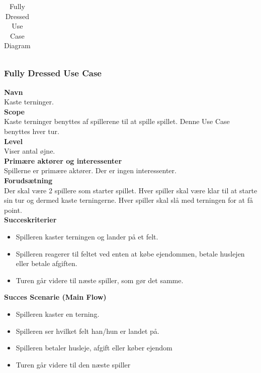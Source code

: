 \begin{table}[H]
\begin{tabular}{|p{0.3\linewidth} | p{0.6\linewidth}|}
        
        
        
        
        
        \end{tabular}
        \caption{Fully Dressed Use Case Diagram}
        \end{table}
        
        \clearpage
        
        \subsubsection{Fully Dressed Use Case}
        \textbf{Navn}\\
        Kaste terninger.\\
        
        \textbf{Scope}\\
        Kaste terninger benyttes af spillerene til at spille spillet. Denne Use Case benyttes hver tur.\\
        
        \textbf{Level}\\
        Viser antal øjne.\\
        
        \textbf{Primære aktører og interessenter} \\
        Spillerne er primære aktører. Der er ingen interessenter.\\
        
        \textbf{Forudsætning} \\
        Der skal være 2 spillere som starter spillet. Hver spiller skal være klar til at starte sin tur og dermed kaste terningerne. Hver spiller skal slå med terningen for at få point.\\
        
        \textbf{Succeskriterier} 
        \begin{itemize}
            \item Spilleren kaster terningen og lander på et felt.
            \item Spilleren reagerer til feltet ved enten at købe ejendommen, betale huslejen eller betale afgiften. 
            \item Turen går videre til næste spiller, som gør det samme. 
        \end{itemize}
        
        \bigskip
        
        \textbf{Succes Scenarie (Main Flow)}
        \begin{itemize}
            \item Spilleren kaster en terning.
            \item Spilleren ser hvilket felt han/hun er landet på.
            \item Spilleren betaler husleje, afgift eller køber ejendom
            \item Turen går videre til den næste spiller
        \end{itemize}
        
